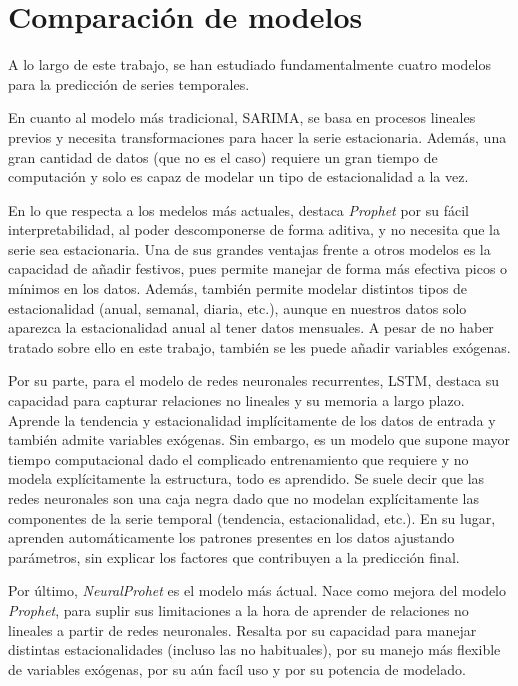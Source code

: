 \documentclass[12pt,twoside]{article}
\begin{document}
\newpage


\section{Comparación de modelos}\label{sec:38}

A lo largo de este trabajo, se han estudiado fundamentalmente cuatro modelos para la predicción de series temporales.

En cuanto al modelo más tradicional, SARIMA, se basa en procesos lineales previos y necesita transformaciones para hacer la serie estacionaria. Además, una gran cantidad de datos (que no es el caso) requiere un gran tiempo de computación y solo es capaz de modelar un tipo de estacionalidad a la vez.

En lo que respecta a los medelos más actuales, destaca \textit{Prophet} por su fácil interpretabilidad, al poder descomponerse de forma aditiva, y no necesita que la serie sea estacionaria. Una de sus grandes ventajas frente a otros modelos es la capacidad de añadir festivos, pues permite manejar de forma más efectiva picos o mínimos en los datos. Además, también permite modelar distintos tipos de estacionalidad (anual, semanal, diaria, etc.), aunque en nuestros datos solo aparezca la estacionalidad anual al tener datos mensuales. A pesar de no haber tratado sobre ello en este trabajo, también se les puede añadir variables exógenas.

Por su parte, para el modelo de redes neuronales recurrentes, LSTM, destaca su capacidad para capturar relaciones no lineales y su memoria a largo plazo. Aprende la tendencia y estacionalidad implícitamente de los datos de entrada y también admite variables exógenas. Sin embargo, es un modelo que supone mayor tiempo computacional dado el complicado entrenamiento que requiere y no modela explícitamente la estructura, todo es aprendido. Se suele decir que las redes neuronales son una caja negra dado que no modelan explícitamente las componentes de la serie temporal (tendencia, estacionalidad, etc.). En su lugar, aprenden automáticamente los patrones presentes en los datos ajustando parámetros, sin explicar los factores que contribuyen a la predicción final.

Por último, \textit{NeuralProhet} es el modelo más áctual. Nace como mejora del modelo \textit{Prophet}, para suplir sus limitaciones a la hora de aprender de relaciones no lineales a partir de redes neuronales. Resalta por su capacidad para manejar distintas estacionalidades (incluso las no habituales), por su manejo más flexible de variables exógenas, por su aún facíl uso y por su potencia de modelado. 
\end{document}
